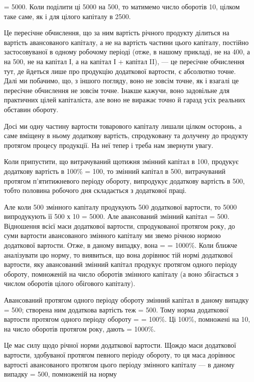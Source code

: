 \parcont{}  %
 = 5000. Коли поділити ці 5000 на 500, то матимемо число оборотів 10,
цілком таке саме, як і для цілого капіталу в 2500.

Це пересічне обчислення, що за ним вартість річного продукту ділиться на вартість авансованого
капіталу, а не на вартість частини цього капіталу, постійно застосовуваної в одному робочому періоді
(отже, в нашому прикладі, не на 400, а на 500, не на капітал І, а на капітал І + капітал II), — це
пересічне обчислення тут, де йдеться лише про продукцію додаткової вартости, є абсолютно точне. Далі
ми побачимо, що, з іншого погляду, воно не зовсім точне, як і взагалі це пересічне обчислення не
зовсім точне. Інакше кажучи, воно задовільне для практичних цілей капіталіста,
але воно не виражає точно й гаразд усіх реальних обставин обороту.

Досі ми одну частину вартости товарового капіталу лишали цілком осторонь, а саме вміщену в ньому
додаткову вартість, спродуковану та долучену до продукту протягом процесу продукції. На неї тепер і
треба нам звернути увагу.

Коли припустити, що витрачуваний щотижня змінний капітал в 100, продукує додаткову
вартість в 100\% = 100, то змінний капітал в 500,  витрачуваний протягом
п’ятитижневого періоду обороту, випродукує додаткову вартість в 500, тобто половина
робочого дня складається з додаткової праці.

Але коли 500 змінного капіталу продукують 500 додаткової вартости, то 5000 випродукують її 500 х 10 = 5000. Але авансований змінний капітал = 500.
Відношення всієї маси додаткової вартости, спродукованої протягом року, до суми вартости
авансованого змінного капіталу ми звемо річною нормою додаткової вартости. Отже, в даному випадку,
вона =  = 1000\%.
Коли ближче аналізувати цю норму, то виявиться, що вона дорівнює тій нормі додаткової вартости, яку
авансований змінний капітал продукує протягом одного періоду обороту, помноженій на число оборотів
змінного капіталу (а воно збігається з числом оборотів цілого обігового капіталу).

Авансований протягом одного періоду обороту змінний капітал в даному випадку = 500;
створена ним додаткова вартість теж = 500. Тому норма додаткової вартости протягом одного
періоду обороту =  = 100\%. Ці 100\%, помножені на 10, на число оборотів протягом року,
дають  = 1000\%.

Це має силу щодо річної норми додаткової вартости. Щождо маси додаткової вартости, здобуваної
протягом певного періоду обороту, то ця маса дорівнює вартості авансованого протягом цього періоду
змінного капіталу — в даному випадку = 500, помноженій на норму
\parbreak{}  %
